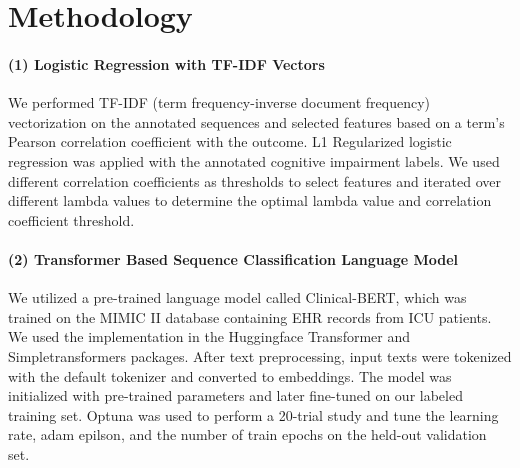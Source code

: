 \documentclass[pmlr,twocolumn,10pt]{jmlr} %
\begin{document}
\section{Methodology}
\label{sec:Methodology}  


\label{sec:TFIDF}  
\paragraph{(1) Logistic Regression with TF-IDF Vectors} We performed TF-IDF (term frequency-inverse document frequency) vectorization on the annotated sequences and selected features based on a term's Pearson correlation coefficient with the outcome. L1 Regularized logistic regression was applied with the annotated cognitive impairment labels. We used different correlation coefficients as thresholds to select features and iterated over different lambda values to determine the optimal lambda value and correlation coefficient threshold. 


\label{sec:Transformer}  
\paragraph{(2) Transformer Based Sequence Classification Language Model} We utilized a pre-trained language model called Clinical-BERT, which was trained on the MIMIC II database containing EHR records from ICU patients. We used the implementation in the Huggingface Transformer and Simpletransformers packages. After text preprocessing, input texts were tokenized with the default tokenizer and converted to embeddings. The model was initialized with pre-trained parameters and later fine-tuned on our labeled training set. Optuna was used to perform a 20-trial study and tune the learning rate, adam epilson, and the number of train epochs on the held-out validation set. 
\end{document}

